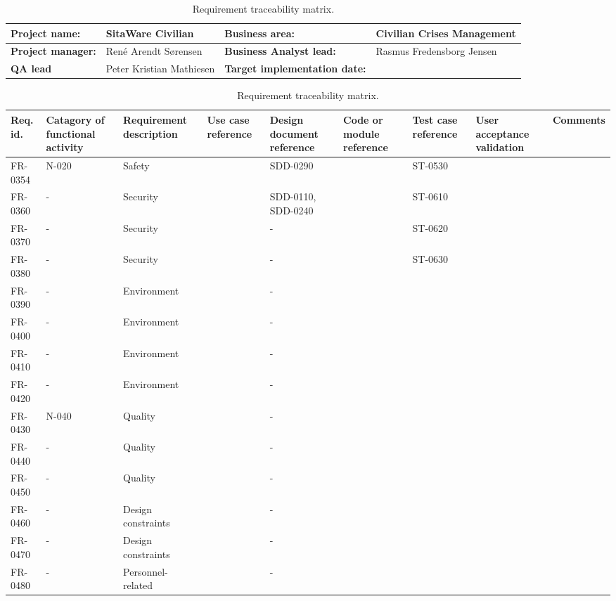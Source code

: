 \begin{sidewaystable}
\begin{table}[H]
\begin{tabular}{|l|l|l|l|}
\hline
 \textbf{Project name:} & SitaWare Civilian & \textbf{Business area:}  & Civilian Crises Management\\ \hline
 \textbf{Project manager:} & René Arendt Sørensen & \textbf{Business Analyst lead:} & Rasmus Fredensborg  Jensen\\ \hline
 \textbf{QA lead} & Peter Kristian Mathiesen & \textbf{Target implementation date:}  & \\ \hline
\end{tabular}	
\begin{tabular}{|p{2cm}|p{2cm}|p{3cm}|p{2cm}|p{2cm}|p{2cm}|p{2cm}|p{2cm}|p{2cm}|}
\hline
 Req. id. & Catagory of functional activity & Requirement description  & Use case reference & Design document reference & Code or module reference & Test case reference & User acceptance validation & Comments\\ \hline
 FR-0354 & N-020 & Safety & &SDD-0290 & & ST-0530 & &\\ \hline
 FR-0360 & - & Security & &SDD-0110, SDD-0240 & & ST-0610 & &\\ \hline
 FR-0370 & - & Security & &- & & ST-0620 & &\\ \hline   	
 FR-0380 & - & Security & &- & & ST-0630 & &\\ \hline
 FR-0390 & - & Environment & &- & & & &\\ \hline
 FR-0400 & - & Environment & &- & & & &\\ \hline
 FR-0410 & - & Environment & &- & & & &\\ \hline
 FR-0420 & - & Environment & &- & & & &\\ \hline
 FR-0430 & N-040 & Quality & &- & & & &\\ \hline
 FR-0440 & - & Quality & &- & & & &\\ \hline
 FR-0450 & - & Quality & &- & & & &\\ \hline
 FR-0460 & - & Design constraints & &- & & & &\\ \hline
 FR-0470 & - & Design constraints & &- & & & &\\ \hline
 FR-0480 & - & Personnel-related & &- & & & &\\ \hline 
 
\end{tabular}	
\caption{Requirement traceability matrix.}
\end{table}

\end{sidewaystable}